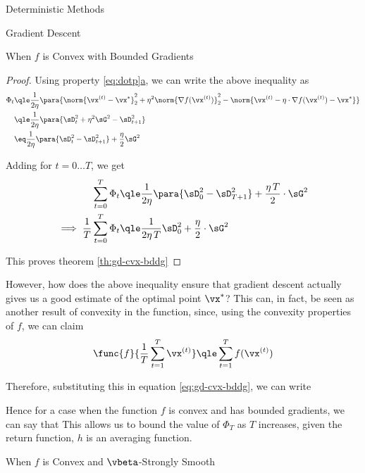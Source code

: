\documentclass{article}
\newcommand{\f}[1]{f(\vx^{(#1)})}
\newcommand{\fs}{f(\vx^\ast)}
\newcommand{\gf}[1]{\nabla f(\vx^{(#1)})}
\newcommand{\x}[1]{\vx^{(#1)}}
\newcommand{\xs}{\vx^{\ast}}
\begin{document}
\begin{psection}{Deterministic Methods}
\begin{psubsection}{Gradient Descent}
\begin{pssubsection}{When $f$ is Convex with Bounded Gradients}
\begin{theorem}
\begin{proof}
					Using property \hyperref[eq:dotp]{\ref*{eq:dotp}a}, we can write the above inequality as
					\begin{align*}
						\Phi_t	&\qle	\frac{1}{2 \eta} \para{\norm{\x{t} - \xs}_2^2 + \eta^2 \norm{\gf{t}}_2^2 - \norm{\x{t} - \eta \cdot \gf{t} - \xs}} \\
								&\qle	\frac{1}{2 \eta} \para{\sD_t^2 + \eta^2 \sG^2 - \sD_{t + 1}^2} \\
								&\eq	\frac{1}{2 \eta} \para{\sD_t^2 - \sD_{t + 1}^2} + \frac{\eta}{2} \sG^2
					\end{align*}

					Adding for $t = 0 \dots T$, we get
					\begin{align*}
						\sum_{t = 0}^T	\Phi_t						&\qle	\frac{1}{2 \eta} \para{\sD_0^2 - \sD_{T+1}^2} + \frac{\eta\,T}{2} \cdot \sG^2 \\
						\implies \frac{1}{T} \sum_{t = 0}^T	\Phi_t	&\qle	\frac{1}{2 \eta \, T} \sD_0^2 + \frac{\eta}{2} \cdot \sG^2
					\end{align*}

					This proves theorem \ref{th:gd-cvx-bddg}
				\end{proof}
			\end{theorem}

			However, how does the above inequality ensure that gradient descent actually gives us a good estimate of the optimal point $\xs$? This can, in fact, be seen as another result of convexity in the function, since, using the convexity properties of $f$, we can claim
			\begin{align*}
				\func{f}{\frac{1}{T} \sum_{t = 1}^T \x{t}}	\qle	\sum_{t = 1}^T \f{t}
			\end{align*}

			Therefore, substituting this in equation \ref{eq:gd-cvx-bddg}, we can write
			\answer[0.7\textwidth]{
				\begin{equation}
					\func{f}{\frac{1}{T} \sum_{t = 1}^T \x{t}} - \fs	\qle	\frac{1}{2 \eta\, T} \sD_0^2 + \frac{\eta}{2} \cdot \sG^2
					\label{eq:gd-1-bound}
				\end{equation}
			}

			Hence for a case when the function $f$ is convex and has bounded gradients, we can say that This allows us to bound the value of $\Phi_T$ as $T$ increases, given the return function, \ie $h$ is an averaging function.

		\end{pssubsection}

		\begin{pssubsection}{When $f$ is Convex and $\vbeta$-Strongly Smooth}


\end{pssubsection}
\end{psubsection}
\end{psection}
\end{document}
